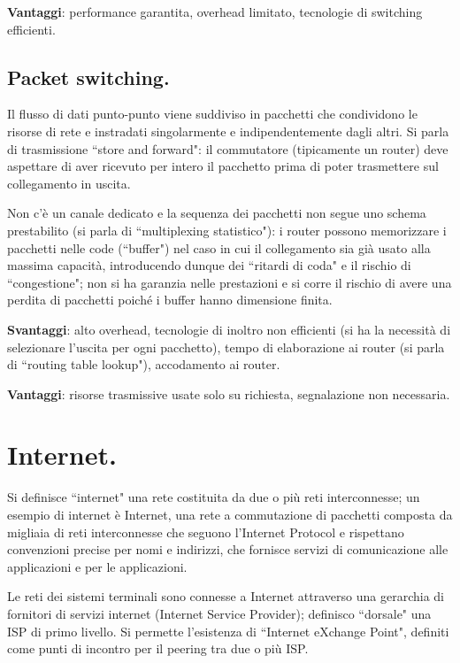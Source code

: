 \documentclass[11pt, italian, openany]{book}
\begin{document}
\begin{sloppypar}
\textbf{Vantaggi}: performance garantita, overhead limitato, tecnologie di switching efficienti.

\subsection*{Packet switching.}
Il flusso di dati punto-punto viene suddiviso in pacchetti che condividono le risorse di rete e instradati singolarmente e indipendentemente
dagli altri. Si parla di trasmissione ``store and forward": il commutatore (tipicamente un router) deve aspettare di aver ricevuto per intero il
pacchetto prima di poter trasmettere sul collegamento in uscita.

Non c’\`e un canale dedicato e la sequenza dei pacchetti non segue uno schema prestabilito (si parla di ``multiplexing statistico"): i router
possono memorizzare i pacchetti nelle code (``buffer") nel caso in cui il collegamento sia gi\`a usato alla massima capacit\`a, introducendo
dunque dei ``ritardi di coda" e il rischio di ``congestione"; non si ha garanzia nelle prestazioni e si corre il rischio di avere una perdita
di pacchetti poich\'e i buffer hanno dimensione finita.

\textbf{Svantaggi}: alto overhead, tecnologie di inoltro non efficienti (si ha la necessit\`a di selezionare l’uscita per ogni pacchetto),
tempo di elaborazione ai router (si parla di ``routing table lookup"), accodamento ai router.

\textbf{Vantaggi}: risorse trasmissive usate solo su richiesta, segnalazione non necessaria.

\section{Internet.}
Si definisce ``internet" una rete costituita da due o pi\`u reti interconnesse; un esempio di internet \`e Internet, una rete a commutazione di
pacchetti composta da migliaia di reti interconnesse che seguono l'Internet Protocol e rispettano convenzioni precise per nomi e indirizzi, che
fornisce servizi di comunicazione alle applicazioni e per le applicazioni.

Le reti dei sistemi terminali sono connesse a Internet attraverso una gerarchia di fornitori di servizi internet (Internet Service Provider);
definisco ``dorsale" una ISP di primo livello. Si permette l'esistenza di ``Internet eXchange Point", definiti come punti di incontro per il peering
tra due o pi\`u ISP.


\end{sloppypar}
\end{document}
